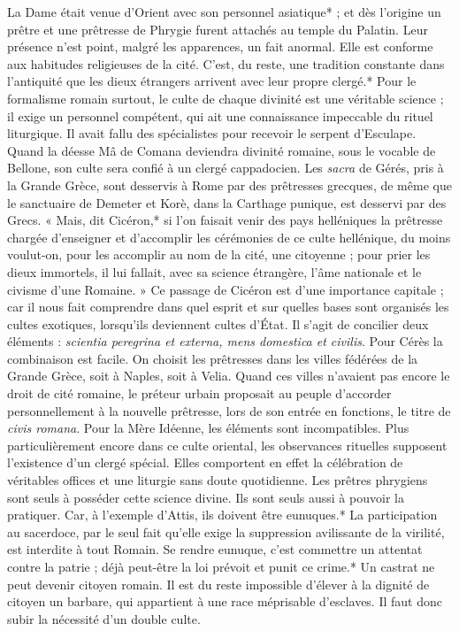 \documentclass[a4paper, 11pt, oneside, polutonikogreek, french]{article}
\begin{document}
La Dame était venue d'Orient avec son personnel asiatique* ; et dès l'origine un prêtre et une prêtresse de Phrygie furent attachés au temple du Palatin. Leur présence n'est point, malgré les apparences, un fait anormal. Elle est conforme aux habitudes religieuses de la cité. C'est, du reste, une tradition constante dans l'antiquité que les dieux étrangers arrivent avec leur propre clergé.* Pour le formalisme romain surtout, le culte de chaque divinité est une véritable science ; il exige un personnel compétent, qui ait une connaissance impeccable du rituel liturgique. Il avait fallu des spécialistes pour recevoir le serpent d'Esculape. Quand la déesse Mâ de Comana deviendra divinité romaine, sous le vocable de Bellone, son culte sera confié à un clergé cappadocien. Les \emph{sacra} de Gérés, pris à la Grande Grèce, sont desservis à Rome par des prêtresses grecques, de même que le sanctuaire de Demeter et Korè, dans la Carthage punique, est desservi par des Grecs. « Mais, dit Cicéron,* si l'on faisait venir des pays helléniques la prêtresse chargée d'enseigner et d'accomplir les cérémonies de ce culte hellénique, du moins voulut-on, pour les accomplir au nom de la cité, une citoyenne ; pour prier les dieux immortels, il lui fallait, avec sa science étrangère, l'âme nationale et le civisme d'une Romaine. » Ce passage de Cicéron est d'une importance capitale ; car il nous fait comprendre dans quel esprit et sur quelles bases sont organisés les cultes exotiques, lorsqu'ils deviennent cultes d'État. Il s'agit de concilier deux éléments : \emph{scientia peregrina et externa, mens domestica et civilis}. Pour Cérès la combinaison est facile. On choisit les prêtresses dans les villes fédérées de la Grande Grèce, soit à Naples, soit à Velia. Quand ces villes n'avaient pas encore le droit de cité romaine, le préteur urbain proposait au peuple d'accorder personnellement à la nouvelle prêtresse, lors de son entrée en fonctions, le titre de \emph{civis romana}. Pour la Mère Idéenne, les éléments sont incompatibles. Plus particulièrement encore dans ce culte oriental, les observances rituelles supposent l'existence d'un clergé spécial. Elles comportent en effet la célébration de véritables offices et une liturgie sans doute quotidienne. Les prêtres phrygiens sont seuls à posséder cette science divine. Ils sont seuls aussi à pouvoir la pratiquer. Car, à l'exemple d'Attis, ils doivent être eunuques.* La participation au sacerdoce, par le seul fait qu'elle exige la suppression avilissante de la virilité, est interdite à tout Romain. Se rendre eunuque, c'est commettre un attentat contre la patrie ; déjà peut-être la loi prévoit et punit ce crime.* Un castrat ne peut devenir citoyen romain. Il est du reste impossible d'élever à la dignité de citoyen un barbare, qui appartient à une race méprisable d'esclaves. Il faut donc subir la nécessité d'un double culte.
\end{document}
